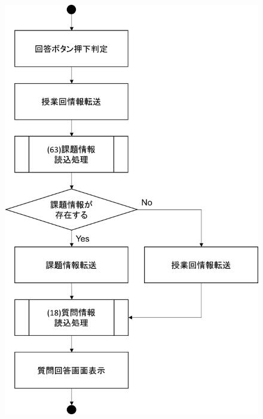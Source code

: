 \begin{figure}[htbp]
 \begin{minipage}{0.5\hsize}
  \begin{center}
   \includegraphics[width=0.9\linewidth,clip]{./img/flow/72.png}
  \end{center}
 \end{minipage}
 \begin{minipage}{0.5\hsize}
  \begin{center}

\end{center}
\end{minipage}
\end{figure}
